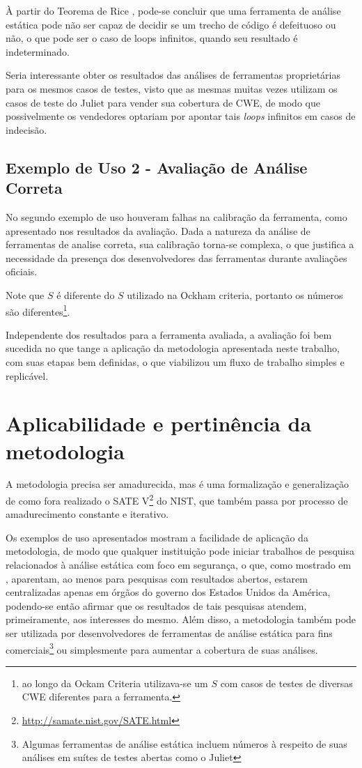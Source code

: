 À partir do Teorema de Rice \cite{rice}, pode-se concluir que uma ferramenta de análise estática pode não ser capaz de decidir se um trecho de código é defeituoso ou não, o que pode ser o caso de loops infinitos, quando seu resultado é indeterminado.

Seria interessante obter os resultados das análises de ferramentas proprietárias para os mesmos casos de testes, visto que as mesmas muitas vezes utilizam os casos de teste do Juliet para vender sua cobertura de CWE, de modo que possivelmente os vendedores optariam por apontar tais \textit{loops} infinitos em casos de indecisão.

\subsection{Exemplo de Uso 2 - Avaliação de Análise Correta}

No segundo exemplo de uso houveram falhas na calibração da ferramenta, como apresentado nos resultados da avaliação. Dada a natureza da análise de ferramentas de analise correta, sua calibração torna-se complexa, o que justifica a necessidade da presença dos desenvolvedores das ferramentas durante avaliações oficiais.

Note que $S$ é diferente do $S$ utilizado na Ockham criteria, portanto os números são diferentes\footnote{ao longo da Ockam Criteria utilizava-se um $S$ com casos de testes de diversas CWE diferentes para a ferramenta.}.

Independente dos resultados para a ferramenta avaliada, a avaliação foi bem sucedida no que tange a aplicação da metodologia apresentada neste trabalho, com suas etapas bem definidas, o que viabilizou um fluxo de trabalho simples e replicável. 

\section{Aplicabilidade e pertinência da metodologia}

A metodologia precisa ser amadurecida, mas é uma formalização e generalização de como fora realizado o SATE V\footnote{\url{http://samate.nist.gov/SATE.html}} do NIST, que também passa por processo de amadurecimento constante e iterativo.

Os exemplos de uso apresentados mostram a facilidade de aplicação da metodologia, de modo que qualquer instituição pode iniciar trabalhos de pesquisa relacionados à análise estática com foco em segurança, o que, como mostrado em , aparentam, ao menos para pesquisas com resultados abertos, estarem centralizadas apenas em órgãos do governo dos Estados Unidos da América, podendo-se então afirmar que os resultados de tais pesquisas atendem, primeiramente, aos interesses do mesmo. Além disso, a metodologia também pode ser utilizada por desenvolvedores de ferramentas de análise estática para fins comerciais\footnote{Algumas ferramentas de análise estática incluem números à respeito de suas análises em suítes de testes abertas como o Juliet} ou simplesmente para aumentar a cobertura de suas análises.

